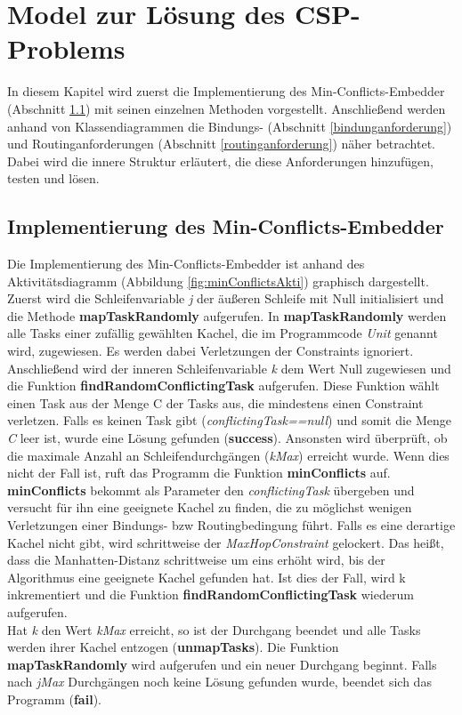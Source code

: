\chapter{Model zur Lösung des CSP-Problems}\label{model}

In diesem Kapitel wird zuerst die Implementierung des Min-Conflicts-Embedder (Abschnitt \ref{minConflictImpl}) mit seinen einzelnen Methoden vorgestellt. Anschließend werden anhand von Klassendiagrammen die Bindungs- (Abschnitt \ref{bindunganforderung}) und Routinganforderungen (Abschnitt \ref{routinganforderung}) näher betrachtet. Dabei wird die innere Struktur erläutert, die diese Anforderungen hinzufügen, testen und lösen.
\section{Implementierung des Min-Conflicts-Embedder}\label{minConflictImpl}

Die Implementierung des Min-Conflicts-Embedder ist anhand des Aktivitätsdiagramm (Abbildung \ref{fig:minConflictsAkti}) graphisch dargestellt. Zuerst wird die Schleifenvariable \textit{j} der äußeren Schleife mit Null initialisiert und die Methode \textbf{mapTaskRandomly} aufgerufen. In \textbf{mapTaskRandomly} werden alle Tasks einer zufällig gewählten Kachel, die im Programmcode \textit{Unit} genannt wird, zugewiesen. Es werden dabei Verletzungen der Constraints ignoriert. Anschließend wird der inneren Schleifenvariable \textit{k} dem Wert Null zugewiesen und die Funktion \textbf{findRandomConflictingTask} aufgerufen. Diese Funktion wählt einen Task aus der Menge C der Tasks aus, die mindestens einen Constraint verletzen. Falls es keinen Task gibt (\textit{conflictingTask==null}) und somit die Menge \textit{C} leer ist, wurde eine Lösung gefunden (\textbf{success}). Ansonsten wird überprüft, ob die maximale Anzahl an Schleifendurchgängen (\textit{kMax}) erreicht wurde. Wenn dies nicht der Fall ist, ruft das Programm die Funktion \textbf{minConflicts} auf. \textbf{minConflicts} bekommt als Parameter den \textit{conflictingTask} übergeben und versucht für ihn eine geeignete Kachel zu finden, die zu möglichst wenigen Verletzungen einer Bindungs- bzw Routingbedingung führt. Falls es eine derartige Kachel nicht gibt, wird schrittweise der \textit{MaxHopConstraint} gelockert. Das heißt, dass die Manhatten-Distanz schrittweise um eins erhöht wird, bis der Algorithmus eine geeignete Kachel gefunden hat. Ist dies der Fall, wird k inkrementiert und die Funktion \textbf{findRandomConflictingTask} wiederum aufgerufen. \\
Hat \textit{k} den Wert \textit{kMax} erreicht, so ist der Durchgang beendet und alle Tasks werden ihrer Kachel entzogen (\textbf{unmapTasks}). Die Funktion \textbf{mapTaskRandomly} wird aufgerufen und ein neuer Durchgang beginnt. Falls nach \textit{jMax} Durchgängen noch keine Lösung gefunden wurde, beendet sich das Programm (\textbf{fail}).


